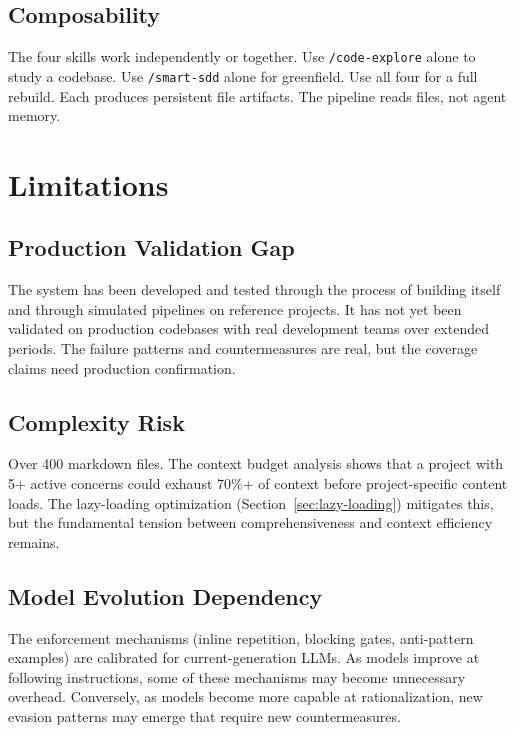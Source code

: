 \documentclass[11pt,a4paper,openright,twoside]{report}
\newcommand{\cmd}[1]{\texttt{/#1}}
\begin{document}
\subsection{Composability}

The four skills work independently or together. Use \cmd{code-explore} alone to study a codebase. Use \cmd{smart-sdd} alone for greenfield. Use all four for a full rebuild. Each produces persistent file artifacts. The pipeline reads files, not agent memory.

\section{Limitations}

\subsection{Production Validation Gap}

The system has been developed and tested through the process of building itself and through simulated pipelines on reference projects. It has not yet been validated on production codebases with real development teams over extended periods. The failure patterns and countermeasures are real, but the coverage claims need production confirmation.

\subsection{Complexity Risk}

Over 400 markdown files. The context budget analysis shows that a project with 5+ active concerns could exhaust 70\%+ of context before project-specific content loads. The lazy-loading optimization (Section~\ref{sec:lazy-loading}) mitigates this, but the fundamental tension between comprehensiveness and context efficiency remains.

\subsection{Model Evolution Dependency}

The enforcement mechanisms (inline repetition, blocking gates, anti-pattern examples) are calibrated for current-generation LLMs. As models improve at following instructions, some of these mechanisms may become unnecessary overhead. Conversely, as models become more capable at rationalization, new evasion patterns may emerge that require new countermeasures.
\end{document}
